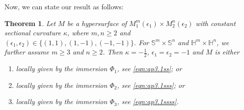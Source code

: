 \documentclass[reqno]{amsart}%
\newtheorem{theorem}{Theorem}[section]   %
\theoremstyle{definition}
\newtheorem{remark}{Remark}[section]
\numberwithin{equation}{section}
\begin{document}



%
Now, we can state our result as follows:


\begin{theorem}\label{thm:1.4}
	Let $M$ be a hypersurface of $M_1^m(\epsilon_1)\times M_2^n(\epsilon_2)$ with constant sectional curvature $\kappa$,  where $m,n\geq 2$ and $(\epsilon_1,\epsilon_2)\in\{(1,1),(1,-1),(-1,-1)\}$. For $\mathbb{S}^m\times \mathbb{S}^n$ 
	and $\mathbb{H}^m\times \mathbb{H}^n$, we further assume $m\geq 3$ and $n\geq 2$. 
	Then $\kappa=-\frac{1}{2}$, $\epsilon_1=\epsilon_2=-1$ and $M$ is either
		
		
		\begin{enumerate}
			\item[(1)]
		locally given by the immersion $\Phi_1$, see \eqref{eqn:ap3.1ss};  or 
		\item[(2)]
		locally given by the immersion $\Phi_2$, see \eqref{eqn:ap3.1sss}; or
		\item[(3)]
		locally given by the immersion $\Phi_3$, see \eqref{eqn:ap3.1ssss}. 
			\end{enumerate}
\end{theorem}
\end{document}
